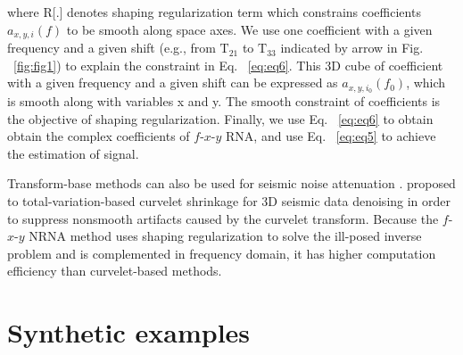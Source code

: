 where R[.] denotes shaping regularization term which constrains coefficients ${{a}_{x,y,i}}(f)$
to be smooth along space axes. We use one coefficient with a given frequency and a given shift 
(e.g., from ${{\text{T}}_{21}}$ to ${{\text{T}}_{33}}$ indicated by arrow in Fig. ~\ref{fig:fig1}) to 
explain the constraint in Eq. ~\ref{eq:eq6}. This 3D cube of coefficient with a given frequency and a 
given shift can be expressed as ${{a}_{x,y,{{i}_{0}}}}({{f}_{0}})$, which is smooth along 
with variables x and y. The smooth constraint of coefficients is the objective of shaping 
regularization. Finally, we use Eq. ~\ref{eq:eq6} to obtain obtain the complex coefficients of $f$-$x$-$y$ 
RNA, and use Eq. ~\ref{eq:eq5} to achieve the estimation of signal. 

Transform-base methods can also be used for seismic noise attenuation \cite[]{Ma2010}. \cite{Tang2011} 
proposed to total-variation-based curvelet shrinkage for 3D seismic data denoising 
in order to suppress nonsmooth artifacts caused by the curvelet transform. Because the $f$-$x$-$y$ 
NRNA method uses shaping regularization to solve the ill-posed inverse problem and is 
complemented in frequency domain, it has higher computation efficiency than curvelet-based methods.

\section{Synthetic examples}






